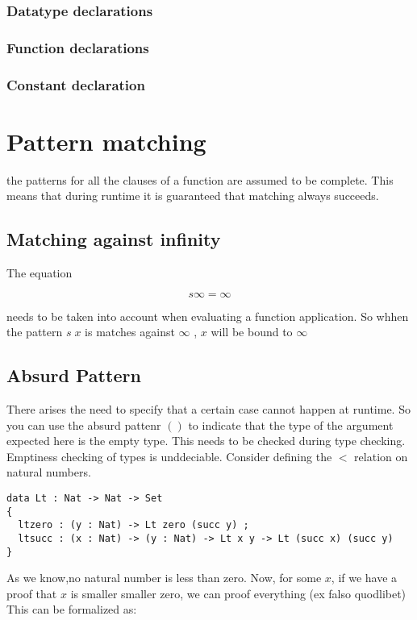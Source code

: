 \subsubsection{Datatype declarations}
\subsubsection{Function declarations}

\subsubsection{Constant declaration}

\section{Pattern matching}

the patterns for all the clauses of a function are assumed to be complete. This means that during runtime
it is guaranteed that matching always succeeds.

\subsection{Matching against infinity}
The equation 

\[ s \infty = \infty \]

needs to be taken into account when evaluating a function application.
So whhen the pattern $ s \; x $ is matches against $ \infty $ , $x$ will be bound to $ \infty $  

\subsection{Absurd Pattern}
There arises the need to specify that a certain case cannot happen at runtime.
So you can use the absurd pattenr $ () $ to indicate that the type of the argument expected here is the empty type.
This needs to be checked during type checking. Emptiness checking of types is unddeciable.
Consider defining the $ < $ relation on natural numbers.

\begin{verbatim}
data Lt : Nat -> Nat -> Set
{
  ltzero : (y : Nat) -> Lt zero (succ y) ;
  ltsucc : (x : Nat) -> (y : Nat) -> Lt x y -> Lt (succ x) (succ y)
}

\end{verbatim}

As we know,no natural number is less than zero.
Now, for some $x$, if we have a proof that $x$ is smaller smaller zero, we can proof everything (ex falso quodlibet)
This can be formalized as:

